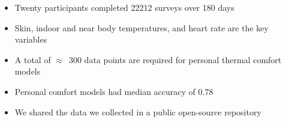 \documentclass[]{report}
\begin{document}
\begin{itemize}
    \item Twenty participants completed 22212 surveys over 180 days
    \item Skin, indoor and near body temperatures, and heart rate are the key variables
    \item A total of $\approx$~300 data points are required for personal thermal comfort models
    \item Personal comfort models had median accuracy of 0.78
    \item We shared the data we collected in a public open-source repository
\end{itemize}
\end{document}

